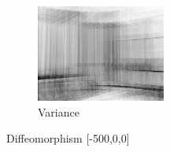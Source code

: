 \documentclass[10pt]{report}
\begin{document}
\begin{figure}[H]
\begin{subfigure}[b]{0.3\textwidth}
                \includegraphics[width=\textwidth]{D1-variance-h.png}
                \caption{Variance}
                \label{fig:v}
        \end{subfigure}
        \caption{Diffeomorphism [-500,0,0]}\label{fig:D0}
\end{figure}
\end{document}
